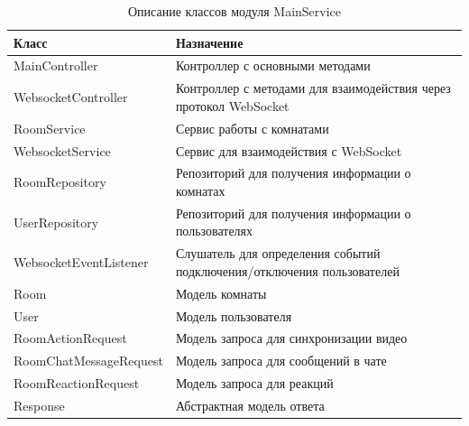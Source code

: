 \documentclass{../includes/TechDoc}
\begin{document}
    \begin{table}[h]
        \caption{\label{tab:class-AuthConfirmView-table}Описание классов модуля MainService}
        \begin{tabularx}{\textwidth}{|l|X|}
            \hline
            \textbf{Класс}           & \textbf{Назначение}                                                    \\
            \hline
            MainController              & Контроллер с основными методами                                        \\
            \hline
            WebsocketController         & Контроллер с методами для взаимодействия через протокол WebSocket      \\
            \hline
            RoomService                 & Сервис работы с комнатами                                              \\
            \hline
            WebsocketService            & Сервис для взаимодействия с WebSocket                                  \\
            \hline
            RoomRepository              & Репозиторий для получения информации о комнатах                        \\
            \hline
            UserRepository              & Репозиторий для получения информации о пользователях                   \\
            \hline
            WebsocketEventListener      & Слушатель для определения событий подключения/отключения пользователей \\
            \hline
            Room                        & Модель комнаты                                                         \\
            \hline
            User                        & Модель пользователя                                                    \\
            \hline
            RoomActionRequest           & Модель запроса для синхронизации видео                                 \\
            \hline
            RoomChatMessageRequest      & Модель запроса для сообщений в чате                                    \\
            \hline
            RoomReactionRequest         & Модель запроса для реакций                                             \\
            \hline
            Response                    & Абстрактная модель ответа                                              \\

\end{tabularx}
\end{table}
\end{document}
